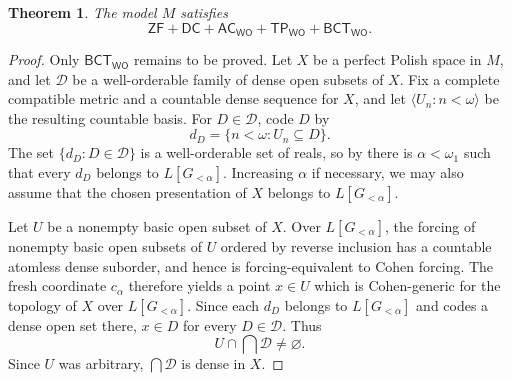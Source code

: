 \documentclass[10pt,a4paper]{amsart}
\newtheorem{theorem}{Theorem}
\newcommand{\BCTWO}{\mathsf{BCT}_{\WO}}
\newcommand{\TP}{\mathsf{TP}_{\WO}}
\newcommand{\WO}{\mathsf{WO}}
\begin{document}
\begin{theorem}\label{thm:model-principles}
The model $M$ satisfies
\[
\mathsf{ZF}+\mathsf{DC}+\mathsf{AC}_{\WO}+\TP+\BCTWO.
\]
\end{theorem}

\begin{proof}
Only $\BCTWO$ remains to be proved.
Let $X$ be a perfect Polish space in $M$, and let $\mathcal D$ be a well-orderable family of dense open subsets of $X$.
Fix a complete compatible metric and a countable dense sequence for $X$, and let $\langle U_n:n<\omega\rangle$ be the resulting countable basis.
For $D\in\mathcal D$, code $D$ by
\[
d_D=\{n<\omega:U_n\subseteq D\}.
\]
The set $\{d_D:D\in\mathcal D\}$ is a well-orderable set of reals, so by  there is $\alpha<\omega_1$ such that every $d_D$ belongs to $L[G_{<\alpha}]$.
Increasing $\alpha$ if necessary, we may also assume that the chosen presentation of $X$ belongs to $L[G_{<\alpha}]$.

Let $U$ be a nonempty basic open subset of $X$.
Over $L[G_{<\alpha}]$, the forcing of nonempty basic open subsets of $U$ ordered by reverse inclusion has a countable atomless dense suborder, and hence is forcing-equivalent to Cohen forcing.
The fresh coordinate $c_\alpha$ therefore yields a point $x\in U$ which is Cohen-generic for the topology of $X$ over $L[G_{<\alpha}]$.
Since each $d_D$ belongs to $L[G_{<\alpha}]$ and codes a dense open set there, $x\in D$ for every $D\in\mathcal D$.
Thus
\[
U\cap\bigcap\mathcal D\neq\varnothing.
\]
Since $U$ was arbitrary, $\bigcap\mathcal D$ is dense in $X$.
\end{proof}
\end{document}

